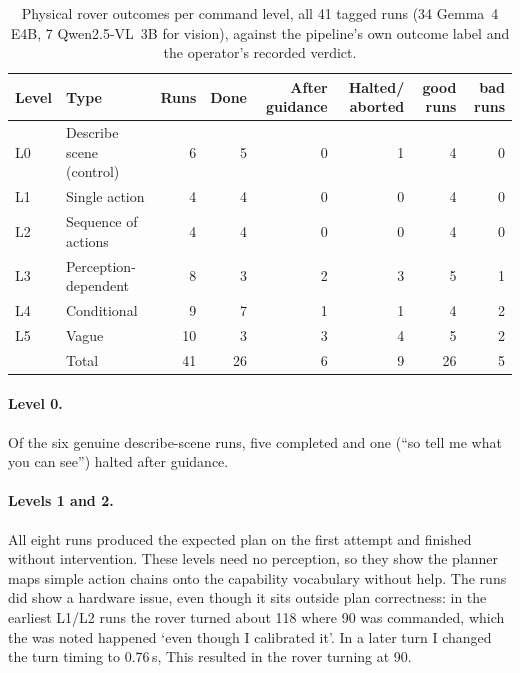 \begin{table}[htbp]
    \centering
    \caption{Physical rover outcomes per command level, all 41 tagged runs (34 Gemma~4 E4B, 7 Qwen2.5-VL~3B for vision), against the pipeline's own outcome label and the operator's recorded verdict.}
    \label{tab:rq1_levels}
    \small
    \setlength{\tabcolsep}{4.5pt}
    \begin{tabular}{lp{2.9cm}rrrrrr}
        \toprule
        Level & Type & Runs & Done & After guidance & Halted/ aborted & good runs & bad runs \\
        \midrule
        L0 & Describe scene (control) & 6 & 5 & 0 & 1 & 4 & 0 \\
        L1 & Single action & 4 & 4 & 0 & 0 & 4 & 0 \\
        L2 & Sequence of actions & 4 & 4 & 0 & 0 & 4 & 0 \\
        L3 & Perception-dependent & 8 & 3 & 2 & 3 & 5 & 1 \\
        L4 & Conditional & 9 & 7 & 1 & 1 & 4 & 2 \\
        L5 & Vague & 10 & 3 & 3 & 4 & 5 & 2 \\
        \midrule
        & Total & 41 & 26 & 6 & 9 & 26 & 5 \\
        \bottomrule
    \end{tabular}
\end{table}


\paragraph{Level 0.} Of the six genuine describe-scene runs, five completed and one (``so tell me what you can
see'') halted after guidance.

\paragraph{Levels 1 and 2.} All eight runs produced the expected plan on the first attempt and finished without
intervention. These levels need no perception, so they show the planner maps simple action chains onto the
capability vocabulary without help. The runs did show a hardware issue, even though it sits outside plan correctness: in the earliest L1/L2 runs the
rover turned about 118\textdegree{} where 90\textdegree{} was commanded, which the was noted happened `even
though I calibrated it'. In a later turn I changed the turn timing to 0.76\,s, This resulted in the rover turning at 90\textdegree{}.


